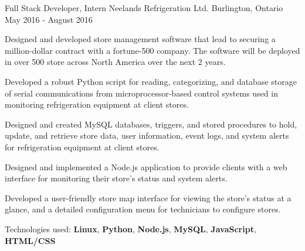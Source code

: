 \begin{cventries}
  \cventry
    {Full Stack Developer, Intern}
    {Neelands Refrigeration Ltd.}
    {Burlington, Ontario}
    {May 2016 - August 2016}
    {
      \begin{cvitems}
        \item {Designed and developed store management software that lead to securing a million-dollar contract with a fortune-500 company. The software will be deployed in over 500 store across North America over the next 2 years.}
        \item {Developed a robust Python script for reading, categorizing, and database storage of serial communications from microprocessor-based control systems used in monitoring refrigeration equipment at client stores.}
        \item {Designed and created MySQL databases, triggers, and stored procedures to hold, update, and retrieve store data, user information, event logs, and system alerts for refrigeration equipment at client stores.}
        \item {Designed and implemented a Node.js application to provide clients with a web interface for monitoring their store's status and system alerts.}
        \item {Developed a user-friendly store map interface for viewing the store's status at a glance, and a detailed configuration menu for technicians to configure stores.}
        \item {Technologies used: \textbf{Linux}, \textbf{Python}, \textbf{Node.js}, \textbf{MySQL}, \textbf{JavaScript}, \textbf{HTML/CSS}}
      \end{cvitems}
    }
  
\end{cventries}
